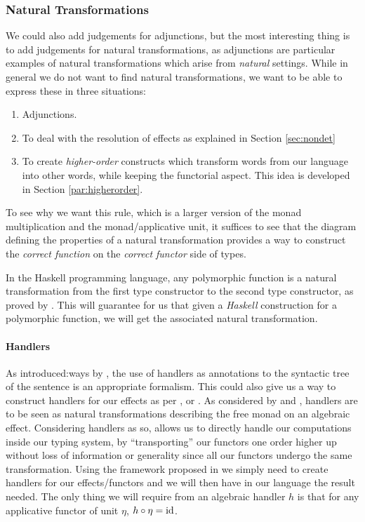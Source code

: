 \subsubsection{Natural Transformations}
\label{subsubsec:transnat}
We could also add judgements for adjunctions, but the most interesting thing is
to add judgements for natural transformations, as adjunctions are particular
examples of natural transformations which arise from \emph{natural} settings.
While in general we do not want to find natural transformations, we want to be
able to express these in three situations:
\begin{enumerate}
	\item Adjunctions.
	\item To deal with the resolution of effects as explained in Section
	      \ref{sec:nondet}
	\item To create \emph{higher-order} constructs which transform words from our
	      language into other words, while keeping the functorial aspect.
	      This idea is developed in Section \ref{par:higherorder}.
\end{enumerate}
To see why we want this rule, which is a larger version of the monad
multiplication and the monad/applicative unit, it suffices to see that the
diagram defining the properties of a natural transformation provides a way
to construct the \emph{correct function} on the \emph{correct functor} side of
types.

\smallskip

In the Haskell programming language, any polymorphic function is
a natural transformation from the first type constructor to the second type
constructor, as proved by \cite{wadlerTheoremsFree1989}.
This will guarantee for us that given a \emph{Haskell} construction for a
polymorphic function, we will get the associated natural transformation.

\paragraph{Handlers}
\label{par:handlers}
As introduced:ways by \cite{marsikAlgebraicEffectsHandlers}, the use of handlers
as annotations to the syntactic tree of the sentence is an appropriate
formalism.
This could also give us a way to construct handlers for our effects as per
\cite{bauerEffectSystemAlgebraic2014}, or
\cite{plotkinHandlingAlgebraicEffects2013}.
As considered by \cite{wuEffectHandlersScope2014} and
\cite{vandenbergFrameworkHigherorderEffects2024}, handlers are to be seen
as natural transformations describing the free monad on an algebraic effect.
Considering handlers as so, allows us to directly handle our computations
inside our typing system, by ``transporting'' our functors one order higher up
without loss of information or generality since all our functors undergo the
same transformation.
Using the framework proposed in \cite{vandenbergFrameworkHigherorderEffects2024}
we simply need to create handlers for our effects/functors and we will then
have in our language the result needed.
The only thing we will require from an algebraic handler $h$ is that for any
applicative functor of unit $\eta$, $h\circ \eta = \mathrm{id}$.

